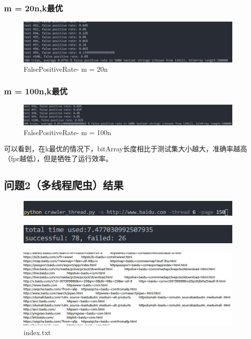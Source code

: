 \documentclass[12pt,a4paper]{article}
\begin{document}
\subsubsection{m = 20n,k最优}
\begin{figure}[H]
	\includegraphics[scale=0.6]{fpr.png}
	\centering
	 \caption{FalsePositiveRate- m = 20n}
\end{figure}

\subsubsection{m = 100n,k最优}
\begin{figure}[H]
	\includegraphics[scale=0.6]{fpr_h.png}
	\centering
	 \caption{FalsePositiveRate- m = 100n}
\end{figure}

可以看到，在k最优的情况下，bitArray长度相比于测试集大小越大，准确率越高（fpr越低），但是牺牲了运行效率。
\subsection{问题2（多线程爬虫）结果}
\begin{figure}[H]
	\includegraphics[scale=0.7]{mt0.png}
\end{figure}
\begin{figure}[H]
	 \includegraphics[scale=0.7]{mt1.png}
\end{figure}
\begin{figure}[H]
	 \includegraphics[scale=0.4]{mt2.png}
	 \caption{index.txt}
\end{figure}
\end{document}
